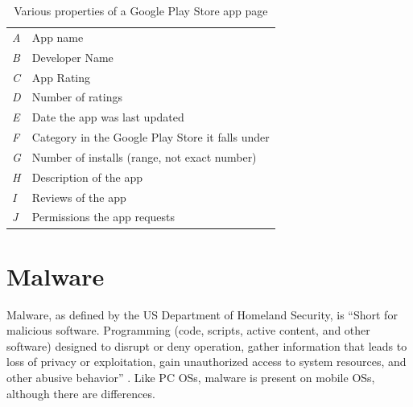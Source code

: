\begin{table}[h]
\begin{small}
\begin{tabular}{l|l}

\textit{A} & App name  \\
\textit{B} & Developer Name  \\
\textit{C} & App Rating  \\
\textit{D} & Number of ratings  \\
\textit{E} & Date the app was last updated  \\
\textit{F} & Category in the Google Play Store it falls under  \\
\textit{G} & Number of installs (range, not exact number)  \\
\textit{H} & Description of the app  \\
\textit{I} & Reviews of the app  \\
\textit{J} & Permissions the app requests  \\

\end{tabular}
\end{small}
\caption{Various properties of a Google Play Store app page}
\label{tab:gpstorekey}
\end{table}


\section{Malware}
Malware, as defined by the US Department of Homeland Security, is ``Short for malicious software. Programming (code, scripts, active content, and other software) designed to disrupt or deny operation, gather information that leads to loss of privacy or exploitation, gain unauthorized access to system resources, and other abusive behavior'' \citep{nash2005undirected}. Like PC OSs, malware is present on mobile OSs, although there are differences.


